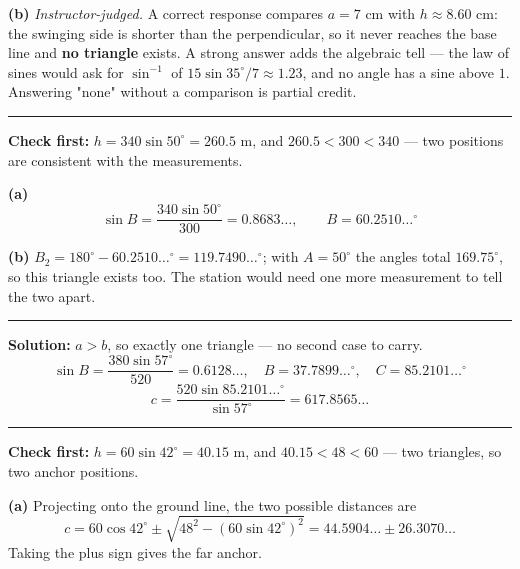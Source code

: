 \documentclass[12pt]{article}
\begin{document}
\textbf{(b)} \emph{Instructor-judged.} A correct response compares $a = 7$ cm with $h \approx 8.60$ cm: the swinging side is shorter than the perpendicular, so it never reaches the base line and \textbf{no triangle} exists. A strong answer adds the algebraic tell --- the law of sines would ask for $\sin^{-1}$ of $15\sin 35^\circ / 7 \approx 1.23$, and no angle has a sine above $1$. Answering "none" without a comparison is partial credit.

\vspace{0.1cm}\noindent\rule{\linewidth}{0.2pt}\vspace{0.1cm}


\textbf{Check first:} $h = 340\sin 50^\circ = 260.5$ m, and $260.5 < 300 < 340$ --- two positions are consistent with the measurements.

\textbf{(a)} \[ \sin B = \frac{340\sin 50^\circ}{300} = 0.8683\ldots, \qquad B = 60.2510\ldots^\circ \]

\textbf{(b)} $B_2 = 180^\circ - 60.2510\ldots^\circ = 119.7490\ldots^\circ$; with $A = 50^\circ$ the angles total $169.75^\circ$, so this triangle exists too. The station would need one more measurement to tell the two apart. 

\vspace{0.1cm}\noindent\rule{\linewidth}{0.2pt}\vspace{0.1cm}


\textbf{Solution:} $a > b$, so exactly one triangle --- no second case to carry.
\[ \sin B = \frac{380\sin 57^\circ}{520} = 0.6128\ldots, \quad B = 37.7899\ldots^\circ, \quad C = 85.2101\ldots^\circ \]
\[ c = \frac{520\sin 85.2101\ldots^\circ}{\sin 57^\circ} = 617.8565\ldots \]

\vspace{0.1cm}\noindent\rule{\linewidth}{0.2pt}\vspace{0.1cm}


\textbf{Check first:} $h = 60\sin 42^\circ = 40.15$ m, and $40.15 < 48 < 60$ --- two triangles, so two anchor positions.

\textbf{(a)} Projecting onto the ground line, the two possible distances are
\[ c = 60\cos 42^\circ \pm \sqrt{48^2 - (60\sin 42^\circ)^2} = 44.5904\ldots \pm 26.3070\ldots \]
Taking the plus sign gives the far anchor. 
\end{document}
